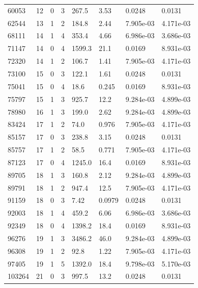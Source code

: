\documentclass[preview]{standalone}
\begin{document}
{{{\begin{tabular}{L{1.2cm}C{1.2cm} C{0.3cm}C{0.5cm} C{1.4cm}C{1.4cm} C{1.4cm}C{1.4cm}}
  60053  &    12  & 0     &  3 &  267.5  & 3.53  & 0.0248 &  0.0131   \\ 
  62544  &    13  & 1     &  2 &  184.8  & 2.44  & 7.905e-03 &  4.171e-03   \\ 
  68111  &    14  & 1     &  4 &  353.4  & 4.66  & 6.986e-03 &  3.686e-03   \\ 
  71147  &    14  & 0     &  4 &  1599.3  & 21.1  & 0.0169 &  8.931e-03   \\ 
  72320  &    14  & 1     &  2 &  106.7  & 1.41  & 7.905e-03 &  4.171e-03   \\ 
  73100  &    15  & 0     &  3 &  122.1  & 1.61  & 0.0248 &  0.0131   \\ 
  75041  &    15  & 0     &  4 &  18.6  & 0.245  & 0.0169 &  8.931e-03   \\ 
  75797  &    15  & 1     &  3 &  925.7  & 12.2  & 9.284e-03 &  4.899e-03   \\ 
  78980  &    16  & 1     &  3 &  199.0  & 2.62  & 9.284e-03 &  4.899e-03   \\ 
  83424  &    17  & 1     &  2 &  74.0  & 0.976  & 7.905e-03 &  4.171e-03   \\ 
  85157  &    17  & 0     &  3 &  238.8  & 3.15  & 0.0248 &  0.0131   \\ 
  85757  &    17  & 1     &  2 &  58.5  & 0.771  & 7.905e-03 &  4.171e-03   \\ 
  87123  &    17  & 0     &  4 &  1245.0  & 16.4  & 0.0169 &  8.931e-03   \\ 
  89705  &    18  & 1     &  3 &  160.8  & 2.12  & 9.284e-03 &  4.899e-03   \\ 
  89791  &    18  & 1     &  2 &  947.4  & 12.5  & 7.905e-03 &  4.171e-03   \\ 
  91159  &    18  & 0     &  3 &  7.42  & 0.0979  & 0.0248 &  0.0131   \\ 
  92003  &    18  & 1     &  4 &  459.2  & 6.06  & 6.986e-03 &  3.686e-03   \\ 
  92349  &    18  & 0     &  4 &  1398.2  & 18.4  & 0.0169 &  8.931e-03   \\ 
  96276  &    19  & 1     &  3 &  3486.2  & 46.0  & 9.284e-03 &  4.899e-03   \\ 
  96308  &    19  & 1     &  2 &  92.8  & 1.22  & 7.905e-03 &  4.171e-03   \\ 
  97405  &    19  & 1     &  5 &  1392.0  & 18.4  & 9.798e-03 &  5.170e-03   \\ 
  103264  &    21  & 0     &  3 &  997.5  & 13.2  & 0.0248 &  0.0131   \\ 

\end{tabular}}}}
\end{document}
